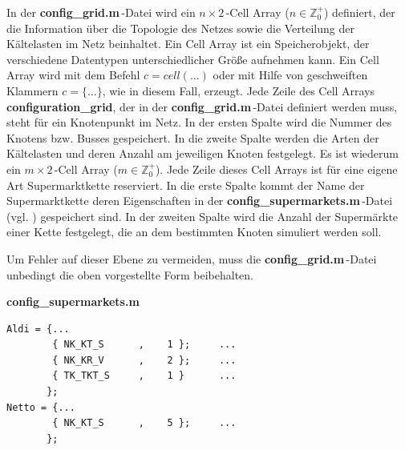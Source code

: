 In der \textbf{config\_grid.m}$\,$-Datei wird  ein $n\times2\,$-Cell Array
($n\in \mathbb{Z}^+_0$) definiert, der die Information über die Topologie des
Netzes sowie die Verteilung der Kältelasten im Netz beinhaltet. Ein Cell Array
ist ein Speicherobjekt, der verschiedene Datentypen unterschiedlicher Größe
aufnehmen kann\cite[Teil 2, Seite 15]{MATLAB-Buch}.  Ein Cell Array wird mit dem
Befehl $c=cell(\ldots)$ oder mit Hilfe von geschweiften Klammern $c=\{\ldots\}$,
wie in diesem Fall, erzeugt. Jede Zeile des Cell Arrays
\textbf{configuration\_grid}, der in der \textbf{config\_grid.m}$\,$-Datei
definiert werden muss, steht für ein Knotenpunkt im Netz. In der ersten Spalte
wird die Nummer des Knotens bzw. Busses gespeichert. In die zweite Spalte
werden die Arten der Kältelasten und deren Anzahl am jeweiligen Knoten
festgelegt. Es ist wiederum ein $m\times2\,$-Cell Array ($m\in \mathbb{Z}^+_0$).
Jede Zeile dieses Cell Arrays ist für eine eigene Art Supermarktkette
reserviert. In die erste Spalte kommt der Name der Supermarktkette deren
Eigenschaften in der \textbf{config\_supermarkets.m$\,$}-Datei (vgl.
) gespeichert sind. In der zweiten Spalte wird die Anzahl der
Supermärkte einer Kette festgelegt, die an dem bestimmten Knoten simuliert
werden soll.

Um Fehler auf dieser Ebene zu vermeiden, muss die
\textbf{config\_grid.m}$\,$-Datei unbedingt die oben vorgestellte Form
beibehalten.

\vspace{3mm}
\noindent\textbf{config\_supermarkets.m}
\vspace{3mm}


\begin{lstlisting}[float=h!,caption=config\_supermarkets.m,label={csuper}]
%%       Kind of fridge     Anzahl
Aldi = {...
        { NK_KT_S      ,    1 };     ...
        { NK_KR_V      ,    2 };     ...
        { TK_TKT_S     ,    1 }      ...
       };
Netto = {...
        { NK_KT_S      ,    5 };     ...
       };
\end{lstlisting}

